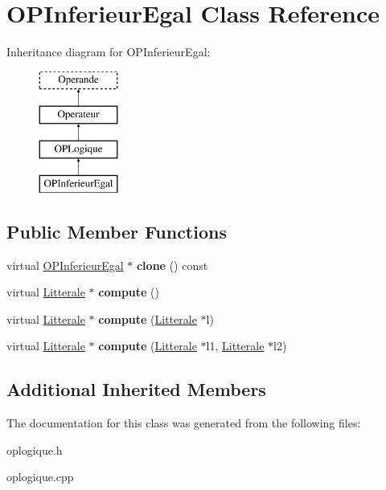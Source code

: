 \hypertarget{class_o_p_inferieur_egal}{}\section{O\+P\+Inferieur\+Egal Class Reference}
\label{class_o_p_inferieur_egal}
Inheritance diagram for O\+P\+Inferieur\+Egal\+:\begin{figure}[H]
\begin{center}
\leavevmode
\includegraphics[height=4.000000cm]{class_o_p_inferieur_egal}
\end{center}
\end{figure}
\subsection*{Public Member Functions}
\begin{DoxyCompactItemize}
\item 
virtual \hyperlink{class_o_p_inferieur_egal}{O\+P\+Inferieur\+Egal} $\ast$ {\bfseries clone} () const \hypertarget{class_o_p_inferieur_egal_a88d147ea2add1d91572caef89bb78b2a}{}\label{class_o_p_inferieur_egal_a88d147ea2add1d91572caef89bb78b2a}

\item 
virtual \hyperlink{class_litterale}{Litterale} $\ast$ {\bfseries compute} ()\hypertarget{class_o_p_inferieur_egal_ab2f17379905b3e206f7c631ec021597e}{}\label{class_o_p_inferieur_egal_ab2f17379905b3e206f7c631ec021597e}

\item 
virtual \hyperlink{class_litterale}{Litterale} $\ast$ {\bfseries compute} (\hyperlink{class_litterale}{Litterale} $\ast$l)\hypertarget{class_o_p_inferieur_egal_a7b466750a13944c3f5d3daae7fafa797}{}\label{class_o_p_inferieur_egal_a7b466750a13944c3f5d3daae7fafa797}

\item 
virtual \hyperlink{class_litterale}{Litterale} $\ast$ {\bfseries compute} (\hyperlink{class_litterale}{Litterale} $\ast$l1, \hyperlink{class_litterale}{Litterale} $\ast$l2)\hypertarget{class_o_p_inferieur_egal_aa0d7bb26bbecdab3b19811a58e8caf78}{}\label{class_o_p_inferieur_egal_aa0d7bb26bbecdab3b19811a58e8caf78}

\end{DoxyCompactItemize}
\subsection*{Additional Inherited Members}


The documentation for this class was generated from the following files\+:\begin{DoxyCompactItemize}
\item 
oplogique.\+h\item 
oplogique.\+cpp\end{DoxyCompactItemize}

